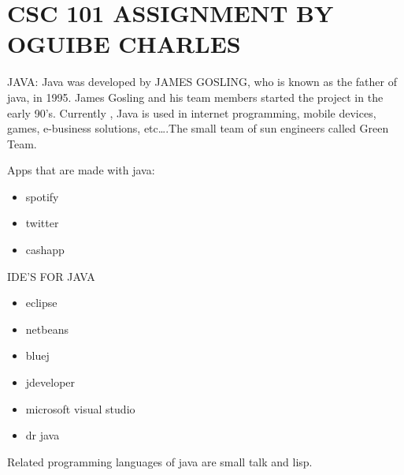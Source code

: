 \documentclass{article}
\begin{document}
		\section{CSC 101 ASSIGNMENT BY OGUIBE CHARLES}
             	{JAVA:}
	Java was developed by JAMES GOSLING, who is known as the father of java, in 1995. James Gosling and his team members started the project in the early 90’s. Currently , Java is used in internet programming, mobile devices, games, e-business solutions, etc….The small team of sun engineers called Green Team.
	
	{Apps that are made with java:}
	 \begin{itemize}
	 	\item{spotify}
	 	\item{twitter}
	 	\item{cashapp}
	 	\end{itemize}
 	  {IDE'S FOR JAVA}
 	  
 	  \begin{itemize}
 	  	\item{eclipse}
 	  	\item{netbeans}
 	  	\item{bluej}
 	  	\item{ jdeveloper}
 	  	\item{microsoft visual studio}
 	  	\item{dr java}
 	  	\end{itemize}  		
 	Related programming languages of java are small talk and lisp.
 	
\end{document}
